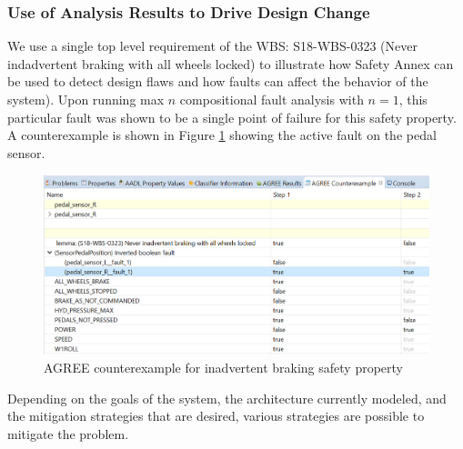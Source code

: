 \subsubsection{Use of Analysis Results to Drive Design Change}
We use a single top level requirement of the WBS: S18-WBS-0323 (Never indadvertent braking with all wheels locked) to illustrate how Safety Annex can be used to detect design flaws and how faults can affect the behavior of the system). Upon running max $n$ compositional fault analysis with $n = 1$, this particular fault was shown to be a single point of failure for this safety property. A counterexample is shown in Figure \ref{fig:counterexample} showing the active fault on the pedal sensor. 

\begin{figure}[htbp]
	\begin{center}
		\includegraphics[width=\textwidth]{images/counterexample.png}
	\end{center}
	\vspace{-0.3in}
	\caption{AGREE counterexample for inadvertent braking safety property}
	\label{fig:counterexample}
\end{figure} 

Depending on the goals of the system, the architecture currently modeled, and the mitigation strategies that are desired, various strategies are possible to mitigate the problem.

